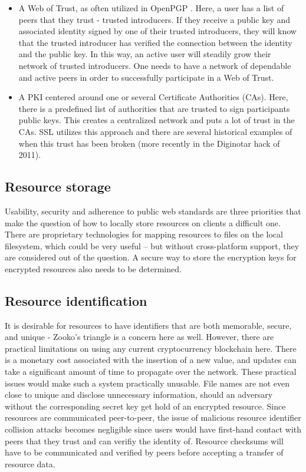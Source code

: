 \begin{itemize}
  \item A Web of Trust, as often utilized in OpenPGP \cite{Maurer:1996}. Here, a user has a list of peers that they trust - trusted introducers. If they receive a public key and associated identity signed by one of their trusted introducers, they will know that the trusted introducer has verified the connection between the identity and the public key. In this way, an active user will steadily grow their network of trusted introducers. One needs to have a network of dependable and active peers in order to successfully participate in a Web of Trust.
\item A PKI centered around one or several Certificate Authorities (CAs). Here, there is a predefined list of authorities that are trusted to sign participants public keys. This creates a centralized network and puts a lot of trust in the CAs. SSL utilizes this approach and there are several historical examples of when this trust has been broken (more recently in the Diginotar hack of 2011).
\end{itemize}

\subsection{Resource storage}
Usability, security and adherence to public web standards are three priorities that make the question of how to locally store resources on clients a difficult one. There are proprietary technologies for mapping resources to files on the local filesystem, which could be very useful – but without cross-platform support, they are considered out of the question. A secure way to store the encryption keys for encrypted resources also needs to be determined.

\subsection{Resource identification}
It is desirable for resources to have identifiers that are both memorable, secure, and unique - Zooko’s triangle is a concern here as well. However, there are practical limitations on using any current cryptocurrency blockchain here. There is a monetary cost associated with the insertion of a new value, and updates can take a significant amount of time to propagate over the network. These practical issues would make such a system practically unusable. File names are not even close to unique and disclose unnecessary information, should an adversary without the corresponding secret key get hold of an encrypted resource. Since resources are communicated peer-to-peer, the issue of malicious resource identifier collision attacks becomes negligible since users would have first-hand contact with peers that they trust and can verifiy the identity of. Resource checksums will have to be communicated and verified by peers before accepting a transfer of resource data.

